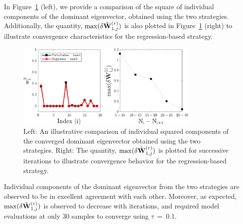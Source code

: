 %
In Figure~\ref{fig:comp} (left),
we provide a comparison of the square of individual components of the dominant eigenvector, obtained using the two 
strategies. Additionally, the quantity, $\max(\delta \hat{\mathbf{{W}}}_{1,j}^{(r)})$ is also plotted in
Figure~\ref{fig:comp} (right) to illustrate convergence characteristics for the regression-based strategy.
%
\begin{figure}[htbp]
 \begin{center}
  \includegraphics[width=0.8\textwidth]{./Figures/eigv6}
\caption{Left: An illustrative comparison of individual squared components of the converged dominant
eigenvector obtained using the two strategies. Right: The quantity,  $\max(\delta \hat{\mathbf{{W}}}_{1,j}^{(r)})$
is plotted for successive iterations to illustrate convergence behavior for the regression-based strategy.}
\label{fig:comp}
\end{center}
\end{figure}
%
Individual components of the dominant eigenvector from the two strategies are observed to be in excellent
agreement with each other. Moreover, as expected,  $\max(\delta \hat{\mathbf{{W}}}_{1,j}^{(r)})$ is observed 
to decrease with iterations, and required model evaluations at only 30 samples to converge using $\tau$~=~0.1.

